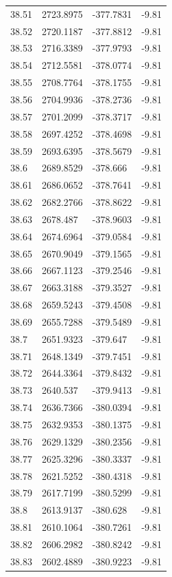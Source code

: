 \begin{table}[H]
\begin{tabular}{llll}
38.51 & 2723.8975 & -377.7831 & -9.81 \\
38.52 & 2720.1187 & -377.8812 & -9.81 \\
38.53 & 2716.3389 & -377.9793 & -9.81 \\
38.54 & 2712.5581 & -378.0774 & -9.81 \\
38.55 & 2708.7764 & -378.1755 & -9.81 \\
38.56 & 2704.9936 & -378.2736 & -9.81 \\
38.57 & 2701.2099 & -378.3717 & -9.81 \\
38.58 & 2697.4252 & -378.4698 & -9.81 \\
38.59 & 2693.6395 & -378.5679 & -9.81 \\
38.6 & 2689.8529 & -378.666 & -9.81 \\
38.61 & 2686.0652 & -378.7641 & -9.81 \\
38.62 & 2682.2766 & -378.8622 & -9.81 \\
38.63 & 2678.487 & -378.9603 & -9.81 \\
38.64 & 2674.6964 & -379.0584 & -9.81 \\
38.65 & 2670.9049 & -379.1565 & -9.81 \\
38.66 & 2667.1123 & -379.2546 & -9.81 \\
38.67 & 2663.3188 & -379.3527 & -9.81 \\
38.68 & 2659.5243 & -379.4508 & -9.81 \\
38.69 & 2655.7288 & -379.5489 & -9.81 \\
38.7 & 2651.9323 & -379.647 & -9.81 \\
38.71 & 2648.1349 & -379.7451 & -9.81 \\
38.72 & 2644.3364 & -379.8432 & -9.81 \\
38.73 & 2640.537 & -379.9413 & -9.81 \\
38.74 & 2636.7366 & -380.0394 & -9.81 \\
38.75 & 2632.9353 & -380.1375 & -9.81 \\
38.76 & 2629.1329 & -380.2356 & -9.81 \\
38.77 & 2625.3296 & -380.3337 & -9.81 \\
38.78 & 2621.5252 & -380.4318 & -9.81 \\
38.79 & 2617.7199 & -380.5299 & -9.81 \\
38.8 & 2613.9137 & -380.628 & -9.81 \\
38.81 & 2610.1064 & -380.7261 & -9.81 \\
38.82 & 2606.2982 & -380.8242 & -9.81 \\
38.83 & 2602.4889 & -380.9223 & -9.81 \\

\end{tabular}
\end{table}
